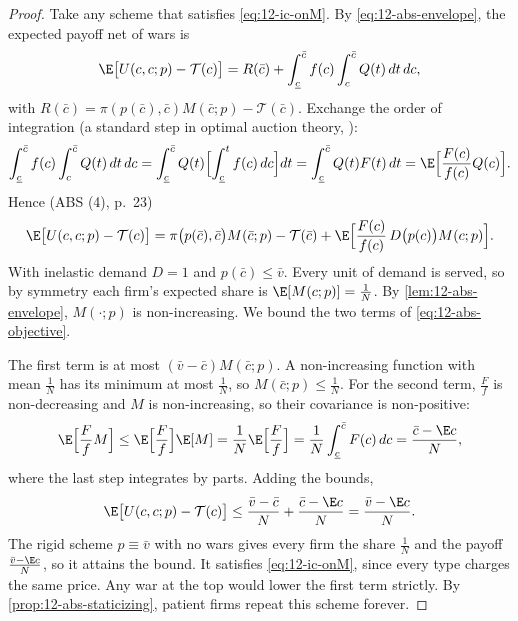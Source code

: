 \begin{proof}
Take any scheme that satisfies \eqref{eq:12-ic-onM}. By \eqref{eq:12-abs-envelope}, the expected payoff net of wars is
\begin{equation*}
\E\bigl[U(c, c; p) - \mathcal T(c)\bigr] = R(\bar c) + \int_{\underline c}^{\bar c}f(c)\int_c^{\bar c}Q(t)\,dt\,dc ,
\end{equation*}
with $R(\bar c) = \pi(p(\bar c), \bar c)M(\bar c; p) - \mathcal T(\bar c)$. Exchange the order of integration (a
standard step in optimal auction theory, \citealp{Myerson1981}):
\begin{equation*}
\int_{\underline c}^{\bar c}f(c)\int_c^{\bar c}Q(t)\,dt\,dc = \int_{\underline c}^{\bar c}Q(t)\Bigl[\int_{\underline c}^{t}f(c)\,dc\Bigr]dt
= \int_{\underline c}^{\bar c}Q(t)F(t)\,dt = \E\Bigl[\frac{F(c)}{f(c)}Q(c)\Bigr].
\end{equation*}
Hence (ABS (4), p.~23)
\begin{equation}\label{eq:12-abs-objective}
\E\bigl[U(c, c; p) - \mathcal T(c)\bigr]
= \pi\bigl(p(\bar c), \bar c\bigr)M(\bar c; p) - \mathcal T(\bar c) + \E\Bigl[\frac{F(c)}{f(c)}\,D\bigl(p(c)\bigr)M(c; p)\Bigr].
\end{equation}
With inelastic demand $D = 1$ and $p(\bar c) \le \bar v$. Every unit of demand is served, so by symmetry each firm's
expected share is $\E[M(c; p)] = \frac{1}{N}$. By \cref{lem:12-abs-envelope}, $M(\cdot; p)$ is non-increasing. We bound
the two terms of \eqref{eq:12-abs-objective}.

The first term is at most $(\bar v - \bar c)M(\bar c; p)$. A non-increasing function with mean $\frac{1}{N}$ has its
minimum at most $\frac{1}{N}$, so $M(\bar c; p) \le \frac{1}{N}$. For the second term, $\frac{F}{f}$ is non-decreasing
and $M$ is non-increasing, so their covariance is non-positive:
\begin{equation*}
\E\Bigl[\frac{F}{f}M\Bigr] \le \E\Bigl[\frac{F}{f}\Bigr]\E[M] = \frac{1}{N}\E\Bigl[\frac{F}{f}\Bigr]
= \frac{1}{N}\int_{\underline c}^{\bar c}F(c)\,dc = \frac{\bar c - \E c}{N},
\end{equation*}
where the last step integrates by parts. Adding the bounds,
\begin{equation*}
\E\bigl[U(c, c; p) - \mathcal T(c)\bigr] \le \frac{\bar v - \bar c}{N} + \frac{\bar c - \E c}{N} = \frac{\bar v - \E c}{N}.
\end{equation*}
The rigid scheme $p \equiv \bar v$ with no wars gives every firm the share $\frac{1}{N}$ and the payoff
$\frac{\bar v - \E c}{N}$, so it attains the bound. It satisfies \eqref{eq:12-ic-onM}, since every type charges the
same price. Any war at the top would lower the first term strictly. By \cref{prop:12-abs-staticizing}, patient firms
repeat this scheme forever.
\end{proof}

